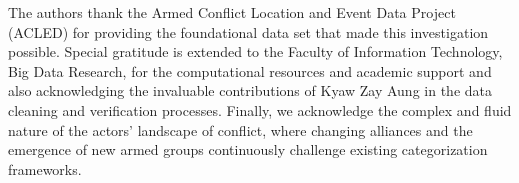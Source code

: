 \documentclass[conference]{IEEEtran}
\begin{document}
The authors thank the Armed Conflict Location and Event Data Project (ACLED) for providing the foundational data set that made this investigation possible. Special gratitude is extended to the Faculty of Information Technology, Big Data Research, for the computational resources and academic support and also acknowledging the invaluable contributions of Kyaw Zay Aung in the data cleaning and verification processes. Finally, we acknowledge the complex and fluid nature of the actors' landscape of conflict, where changing alliances and the emergence of new armed groups continuously challenge existing categorization frameworks.



\end{document}

